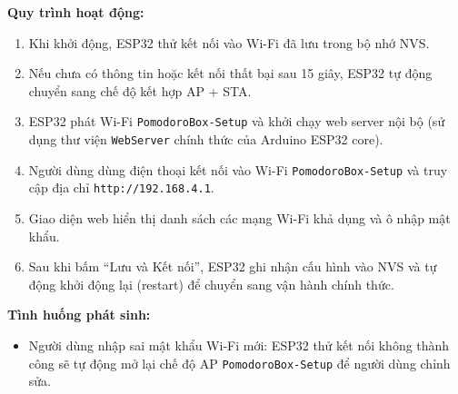\textbf{Quy trình hoạt động:}
\begin{enumerate}
    \item Khi khởi động, ESP32 thử kết nối vào Wi-Fi đã lưu trong bộ nhớ NVS.
    \item Nếu chưa có thông tin hoặc kết nối thất bại sau 15 giây, ESP32 tự động chuyển sang chế độ kết hợp AP + STA.
    \item ESP32 phát Wi-Fi \texttt{PomodoroBox-Setup} và khởi chạy web server nội bộ (sử dụng thư viện \texttt{WebServer} chính thức của Arduino ESP32 core).
    \item Người dùng dùng điện thoại kết nối vào Wi-Fi \texttt{PomodoroBox-Setup} và truy cập địa chỉ \texttt{http://192.168.4.1}.
    \item Giao diện web hiển thị danh sách các mạng Wi-Fi khả dụng và ô nhập mật khẩu.
    \item Sau khi bấm ``Lưu và Kết nối'', ESP32 ghi nhận cấu hình vào NVS và tự động khởi động lại (restart) để chuyển sang vận hành chính thức.
\end{enumerate}

\textbf{Tình huống phát sinh:}
\begin{itemize}
    \item Người dùng nhập sai mật khẩu Wi-Fi mới: ESP32 thử kết nối không thành công sẽ tự động mở lại chế độ AP \texttt{PomodoroBox-Setup} để người dùng chỉnh sửa.
\end{itemize}
